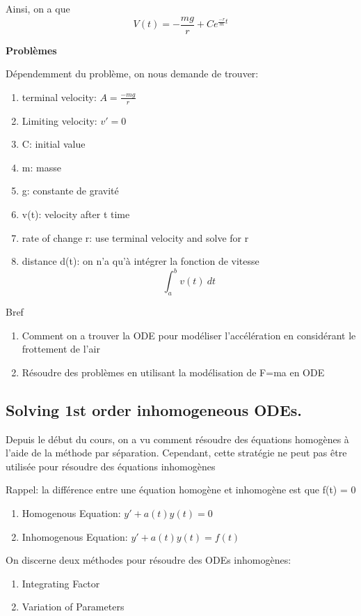 \documentclass{article}
\begin{document}
Ainsi, on a que $$ V(t) = -\frac{mg}{r} + C e^{\frac{-r}{m} t} $$

\textbf{Problèmes}

Dépendemment du problème, on nous demande de trouver:
\begin{enumerate}
    \item terminal velocity: $ A = \frac{-mg}{r} $
    \item Limiting velocity: $ v' = 0 $
    \item C: initial value
    \item m: masse
    \item g: constante de gravité
    \item v(t): velocity after t time
    \item rate of change r: use terminal velocity and solve for r
    \item distance d(t): on n'a qu'à intégrer la fonction de vitesse
	$$ \int_{{a}}^{{b}} {v(t)} \: d{t} $$
\end{enumerate}

Bref
\begin{enumerate}
    \item Comment on a trouver la ODE pour modéliser l'accélération
	en considérant le frottement de l'air
    \item Résoudre des problèmes en utilisant la modélisation de F=ma
	en ODE
\end{enumerate}

\subsection{Solving 1st order inhomogeneous ODEs.}

Depuis le début du cours, on a vu comment résoudre des équations homogènes
à l'aide de la méthode par séparation. Cependant, cette stratégie ne peut pas
être utilisée pour résoudre des équations inhomogènes

Rappel: la différence entre une équation homogène et inhomogène est que f(t) = 0
\begin{enumerate}
    \item Homogenous Equation: $ y' + a(t)y(t) = 0 $
    \item Inhomogenous Equation: $ y' + a(t)y(t) = f(t)$
\end{enumerate}

On discerne deux méthodes pour résoudre des ODEs inhomogènes:
\begin{enumerate}
    \item Integrating Factor
    \item Variation of Parameters
\end{enumerate}
\end{document}
